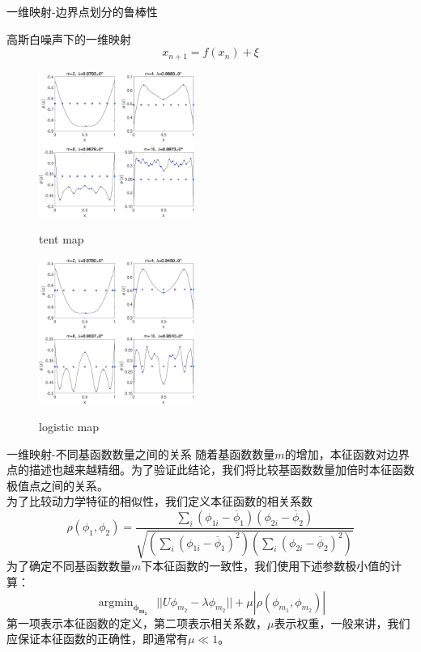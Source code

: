 \documentclass{beamer}
\begin{document}
    \begin{frame}{一维映射-边界点划分的鲁棒性}
    	\begin{block}{高斯白噪声下的一维映射}
    		$$x_{n+1}=f(x_n)+\xi$$
    	\end{block}
    \begin{figure}
    	\begin{minipage}{0.45\linewidth}
    		\centerline{\includegraphics[width=2in]{images/05a-Tent_eigen_Gauss_n1000_m2-4-8-16_d0-001.eps}}
    		\centerline{tent map}
    	\end{minipage}
    	\hfill
    	\begin{minipage}{0.45\linewidth}
    		\centerline{\includegraphics[width=2in]{images/05b-Logistic_eigen_Gauss_n1000_m2-4-8-16_d0-001.eps}}
    		\centerline{logistic map}
    	\end{minipage}
    \end{figure}
    \end{frame}
	\begin{frame}{一维映射-不同基函数数量之间的关系}
		随着基函数数量$m$的增加，本征函数对边界点的描述也越来越精细。为了验证此结论，我们将比较基函数数量加倍时本征函数极值点之间的关系。\\
		为了比较动力学特征的相似性，我们定义本征函数的相关系数
		$$\rho(\phi_1,\phi_2)=\dfrac{\sum_i(\phi_{1i}-\overline{\phi}_1)(\phi_{2i}-\overline{\phi}_2)}{\sqrt{(\sum_i(\phi_{1i}-\overline{\phi}_1)^2)(\sum_i(\phi_{2i}-\overline{\phi}_2)^2)}}$$
		为了确定不同基函数数量$m$下本征函数的一致性，我们使用下述参数极小值的计算：
		$$\mathop{\arg\min}_{\boldsymbol{\phi_{m_2}}} \ \ || U\phi_{m_2}-\lambda \phi_{m_2} || + \mu |\rho(\phi_{m_1},\phi_{m_2})|$$
		第一项表示本征函数的定义，第二项表示相关系数，$\mu$表示权重，一般来讲，我们应保证本征函数的正确性，即通常有$\mu\ll 1$。
    \end{frame}
\end{document}

